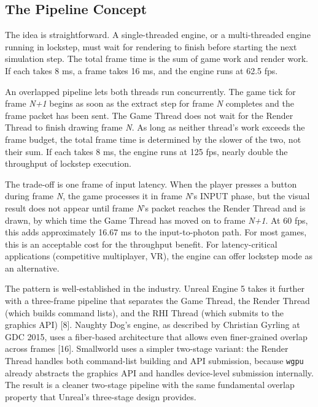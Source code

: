 \documentclass[
  11pt,
  letterpaper,
  DIV=11,
  numbers=noendperiod,
  twoside,
  open=right]{scrreprt}
\begin{document}
\subsection{The Pipeline Concept}\label{the-pipeline-concept}

The idea is straightforward. A single-threaded engine, or a
multi-threaded engine running in lockstep, must wait for rendering to
finish before starting the next simulation step. The total frame time is
the sum of game work and render work. If each takes 8 ms, a frame takes
16 ms, and the engine runs at 62.5 fps.

An overlapped pipeline lets both threads run concurrently. The game tick
for frame \emph{N+1} begins as soon as the extract step for frame
\emph{N} completes and the frame packet has been sent. The Game Thread
does not wait for the Render Thread to finish drawing frame \emph{N}. As
long as neither thread's work exceeds the frame budget, the total frame
time is determined by the slower of the two, not their sum. If each
takes 8 ms, the engine runs at 125 fps, nearly double the throughput of
lockstep execution.

The trade-off is one frame of input latency. When the player presses a
button during frame \emph{N}, the game processes it in frame \emph{N}'s
INPUT phase, but the visual result does not appear until frame
\emph{N}'s packet reaches the Render Thread and is drawn, by which time
the Game Thread has moved on to frame \emph{N+1}. At 60 fps, this adds
approximately 16.67 ms to the input-to-photon path. For most games, this
is an acceptable cost for the throughput benefit. For latency-critical
applications (competitive multiplayer, VR), the engine can offer
lockstep mode as an alternative.

The pattern is well-established in the industry. Unreal Engine 5 takes
it further with a three-frame pipeline that separates the Game Thread,
the Render Thread (which builds command lists), and the RHI Thread
(which submits to the graphics API) {[}8{]}. Naughty Dog's engine, as
described by Christian Gyrling at GDC 2015, uses a fiber-based
architecture that allows even finer-grained overlap across frames
{[}16{]}. Smallworld uses a simpler two-stage variant: the Render Thread
handles both command-list building and API submission, because
\texttt{wgpu} already abstracts the graphics API and handles
device-level submission internally. The result is a cleaner two-stage
pipeline with the same fundamental overlap property that Unreal's
three-stage design provides.
\end{document}
